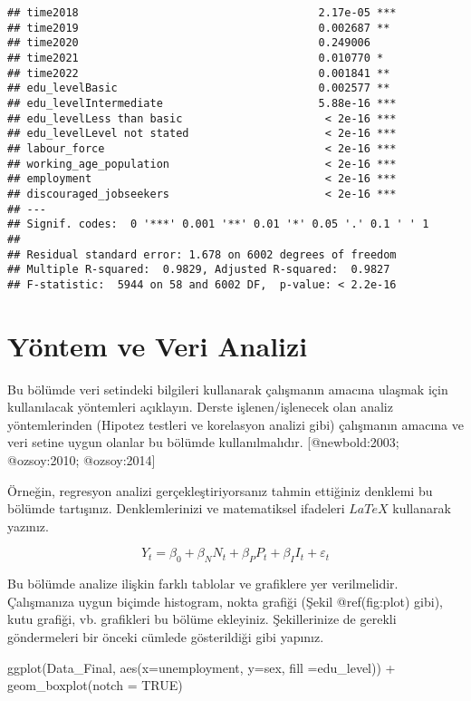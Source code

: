 \documentclass[
]{article}
\newenvironment{Shaded}{\begin{snugshade}}{\end{snugshade}}
\newcommand{\AttributeTok}[1]{\textcolor[rgb]{0.77,0.63,0.00}{#1}}
\newcommand{\ConstantTok}[1]{\textcolor[rgb]{0.00,0.00,0.00}{#1}}
\newcommand{\FunctionTok}[1]{\textcolor[rgb]{0.00,0.00,0.00}{#1}}
\newcommand{\NormalTok}[1]{#1}
\newcommand{\SpecialCharTok}[1]{\textcolor[rgb]{0.00,0.00,0.00}{#1}}
\begin{document}
\begin{verbatim}
## time2018                                     2.17e-05 ***
## time2019                                     0.002687 ** 
## time2020                                     0.249006    
## time2021                                     0.010770 *  
## time2022                                     0.001841 ** 
## edu_levelBasic                               0.002577 ** 
## edu_levelIntermediate                        5.88e-16 ***
## edu_levelLess than basic                      < 2e-16 ***
## edu_levelLevel not stated                     < 2e-16 ***
## labour_force                                  < 2e-16 ***
## working_age_population                        < 2e-16 ***
## employment                                    < 2e-16 ***
## discouraged_jobseekers                        < 2e-16 ***
## ---
## Signif. codes:  0 '***' 0.001 '**' 0.01 '*' 0.05 '.' 0.1 ' ' 1
## 
## Residual standard error: 1.678 on 6002 degrees of freedom
## Multiple R-squared:  0.9829, Adjusted R-squared:  0.9827 
## F-statistic:  5944 on 58 and 6002 DF,  p-value: < 2.2e-16
\end{verbatim}

\hypertarget{yuxf6ntem-ve-veri-analizi}{%
\section{Yöntem ve Veri Analizi}\label{yuxf6ntem-ve-veri-analizi}}

Bu bölümde veri setindeki bilgileri kullanarak çalışmanın amacına
ulaşmak için kullanılacak yöntemleri açıklayın. Derste işlenen/işlenecek
olan analiz yöntemlerinden (Hipotez testleri ve korelasyon analizi gibi)
çalışmanın amacına ve veri setine uygun olanlar bu bölümde
kullanılmalıdır. {[}@newbold:2003; @ozsoy:2010; @ozsoy:2014{]}

Örneğin, regresyon analizi gerçekleştiriyorsanız tahmin ettiğiniz
denklemi bu bölümde tartışınız. Denklemlerinizi ve matematiksel
ifadeleri \(LaTeX\) kullanarak yazınız.

\[
Y_t = \beta_0 + \beta_N N_t + \beta_P P_t + \beta_I I_t + \varepsilon_t
\]

Bu bölümde analize ilişkin farklı tablolar ve grafiklere yer
verilmelidir. Çalışmanıza uygun biçimde histogram, nokta grafiği (Şekil
@ref(fig:plot) gibi), kutu grafiği, vb. grafikleri bu bölüme ekleyiniz.
Şekillerinize de gerekli göndermeleri bir önceki cümlede gösterildiği
gibi yapınız.

\begin{Shaded}
\begin{Highlighting}[]
\FunctionTok{ggplot}\NormalTok{(Data\_Final, }\FunctionTok{aes}\NormalTok{(}\AttributeTok{x=}\NormalTok{unemployment, }\AttributeTok{y=}\NormalTok{sex, }\AttributeTok{fill =}\NormalTok{edu\_level)) }\SpecialCharTok{+}
  \FunctionTok{geom\_boxplot}\NormalTok{(}\AttributeTok{notch =} \ConstantTok{TRUE}\NormalTok{)}
\end{Highlighting}
\end{Shaded}
\end{document}
